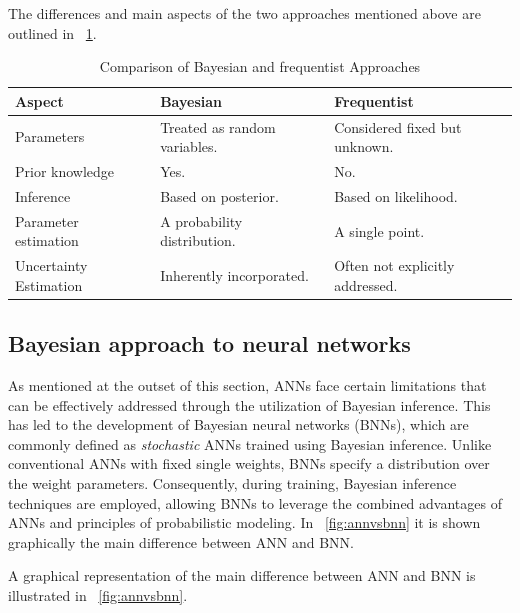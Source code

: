 The differences and main aspects of the two approaches mentioned above are outlined in \Tab~\ref{table:BayesVsFreq}.

\begin{table}[h]
	\centering
	\begin{tabular}{|| l | l | l ||} 
		\hline
		\textbf{Aspect} & \textbf{Bayesian} & \textbf{Frequentist} \\
		\hline
		\hline
		Parameters & Treated as random variables. & Considered fixed but unknown. \\
		Prior knowledge & Yes. & No. \\
		Inference & Based on posterior. & Based on likelihood. \\
		Parameter estimation & A probability distribution. & A single point. \\	
		Uncertainty Estimation & Inherently incorporated. & Often not explicitly addressed. \\	
		\hline
	\end{tabular}	
	\caption{Comparison of Bayesian and frequentist Approaches}
	\label{table:BayesVsFreq}
\end{table}

\subsection{Bayesian approach to neural networks}

As mentioned at the outset of this section, ANNs face certain limitations that can be effectively addressed through the utilization of Bayesian inference. 
This has led to the development of Bayesian neural networks (BNNs), which are commonly defined as \textit{stochastic} ANNs trained using Bayesian inference. Unlike conventional ANNs with fixed single weights, BNNs specify a distribution over the weight parameters. 
Consequently, during training, Bayesian inference techniques are employed, allowing BNNs to leverage the combined advantages of ANNs and principles of probabilistic modeling. In \Fig~\ref{fig:annvsbnn} it is shown graphically the main difference between ANN and BNN.

A graphical representation of the main difference between ANN and BNN is illustrated in \Fig~\ref{fig:annvsbnn}.

